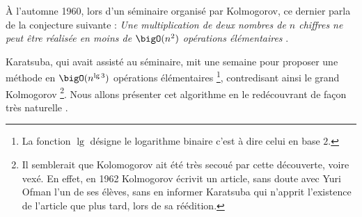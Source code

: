À l'automne 1960, lors d'un séminaire organisé par Kolmogorov, ce dernier parla de la conjecture suivante :
\emph{\og Une multiplication de deux nombres de $n$ chiffres ne peut être réalisée en moins de $\bigO(n^2)$ opérations élémentaires \fg}.

\medskip

Karatsuba, qui avait assisté au séminaire, mit une semaine pour proposer une méthode en $\bigO(n^{\lg 3})$ opérations élémentaires
\footnote{
	La fonction $\lg$ désigne le logarithme binaire c'est à dire celui en base $2$.	
},
contredisant ainsi le grand Kolmogorov
\footnote{
	Il semblerait que Kolomogorov ait été très secoué par cette découverte, voire vexé.
	En effet, en 1962 Kolmogorov écrivit un article, sans doute avec Yuri Ofman l'un de ses élèves, sans en informer Karatsuba qui n'apprit l'existence de l'article que plus tard, lors de sa réédition. 
}.
Nous allons présenter cet algorithme en le redécouvrant de façon très \og naturelle \fg.
